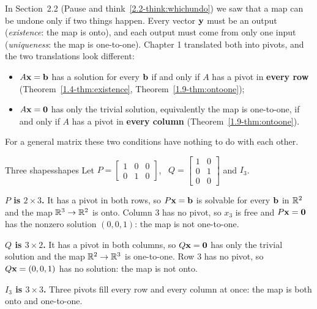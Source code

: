 \documentclass[11pt]{article}
\begin{document}
In Section~2.2 (Pause and think~\ref{2.2-think:whichundo}) we saw that a map can be undone only if two things happen. Every vector $\mathbf{y}$ must be an output (\emph{existence}: the map is onto), and each output must come from only one input (\emph{uniqueness}: the map is one-to-one). Chapter 1 translated both into pivots, and the two translations look different:
\begin{itemize}
  \item $A\mathbf{x}=\mathbf{b}$ has a solution for every $\mathbf{b}$ if and only if $A$ has a pivot in \textbf{every row} (Theorem~\ref{1.4-thm:existence}, Theorem~\ref{1.9-thm:ontoone});
  \item $A\mathbf{x}=\mathbf{0}$ has only the trivial solution, equivalently the map is one-to-one, if and only if $A$ has a pivot in \textbf{every column} (Theorem~\ref{1.9-thm:ontoone}).
\end{itemize}
For a general matrix these two conditions have nothing to do with each other.

\begin{exmp}{Three shapes}{shapes}
Let $P=\begin{bmatrix}1&0&0\\0&1&0\end{bmatrix}$, \ $Q=\begin{bmatrix}1&0\\0&1\\0&0\end{bmatrix}$ and $I_3$.

\textbf{$P$ is $2\times3$.} It has a pivot in both rows, so $P\mathbf{x}=\mathbf{b}$ is solvable for every $\mathbf{b}$ in $\mathbb{R}^2$ and the map $\mathbb{R}^3\to\mathbb{R}^2$ is onto. Column $3$ has no pivot, so $x_3$ is free and $P\mathbf{x}=\mathbf{0}$ has the nonzero solution $(0,0,1)$: the map is not one-to-one.

\textbf{$Q$ is $3\times2$.} It has a pivot in both columns, so $Q\mathbf{x}=\mathbf{0}$ has only the trivial solution and the map $\mathbb{R}^2\to\mathbb{R}^3$ is one-to-one. Row $3$ has no pivot, so $Q\mathbf{x}=(0,0,1)$ has no solution: the map is not onto.

\textbf{$I_3$ is $3\times3$.} Three pivots fill every row and every column at once: the map is both onto and one-to-one.
\end{exmp}
\end{document}
